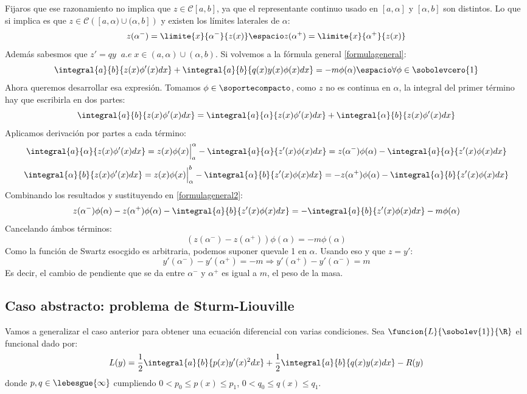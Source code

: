 Fijaros que ese razonamiento no implica que $z\in\mathcal{C}[a,b]$, ya que el representante continuo usado en $[a,\alpha]$ y $[\alpha,b]$ son distintos. Lo que si implica es que $z\in\mathcal{C}\left([a,\alpha)\cup(\alpha,b]\right)$ y existen los límites laterales de $\alpha$:
\[
z(\alpha^-)=\limite{x}{\alpha^-}{z(x)} \espacio z(\alpha^+)=\limite{x}{\alpha^+}{z(x)}
\]
Además sabesmos que $z'=qy \;\; a.e \; x \in(a,\alpha)\cup(\alpha,b)$. Si volvemos a la fórmula general \eqref{formulageneral}:
\begin{equation}
\label{formulageneral2}
\integral{a}{b}{z(x)\phi'(x)dx}+\integral{a}{b}{q(x)y(x)\phi(x)dx}=-m\phi(\alpha) \espacio \forall\phi\in\sobolevcero{1}
\end{equation}
Ahora queremos desarrollar esa expresión. Tomamos $\phi\in\soportecompacto$, como $z$ no es continua en $\alpha$, la integral del primer término hay que escribirla en dos partes:
\[
\integral{a}{b}{z(x)\phi'(x)dx}=\integral{a}{\alpha}{z(x)\phi'(x)dx}+\integral{\alpha}{b}{z(x)\phi'(x)dx}
\]
Aplicamos derivación por partes a cada término:
\[
\integral{a}{\alpha}{z(x)\phi'(x)dx}=z(x)\phi(x)\Big|_a^\alpha-\integral{a}{\alpha}{z'(x)\phi(x)dx}=z(\alpha^-)\phi(\alpha)-\integral{a}{\alpha}{z'(x)\phi(x)dx}
\]
\[
\integral{\alpha}{b}{z(x)\phi'(x)dx}=z(x)\phi(x)\Big|_\alpha^b-\integral{\alpha}{b}{z'(x)\phi(x)dx}=-z(\alpha^+)\phi(\alpha)-\integral{\alpha}{b}{z'(x)\phi(x)dx}
\]
Combinando los resultados y sustituyendo en \eqref{formulageneral2}:
\[
z(\alpha^-)\phi(\alpha)-z(\alpha^+)\phi(\alpha)-\integral{a}{b}{z'(x)\phi(x)dx}=-\integral{a}{b}{z'(x)\phi(x)dx}-m\phi(\alpha)
\]
Cancelando ámbos términos:
\[
\left(z(\alpha^-)-z(\alpha^+)\right)\phi(\alpha)=-m\phi(\alpha)
\]
Como la función de Swartz esocgido es arbitraria, podemos suponer quevale 1 en $\alpha$. Usando eso y que $z=y'$:
\[
y'(\alpha^-)-y'(\alpha^+)=-m \Rightarrow y'(\alpha^+)-y'(\alpha^-)=m  
\]
Es decir, el cambio de pendiente que se da entre $\alpha^-$ y $\alpha^+$ es igual a $m$, el peso de la masa.


\subsection{Caso abstracto: problema de Sturm-Liouville}
Vamos a generalizar el caso anterior para obtener una ecuación diferencial con varias condiciones. Sea $\funcion{L}{\sobolev{1}}{\R}$ el funcional dado por:
\[
L(y)=\frac{1}{2}\integral{a}{b}{p(x)y'(x)^2dx}+\frac{1}{2}\integral{a}{b}{q(x)y(x)dx}-R(y)
\]
donde $p,q\in\lebesgue{\infty}$ cumpliendo $0<p_0\leq p(x)\leq p_1$, $0<q_0\leq q(x)\leq q_1$. 

